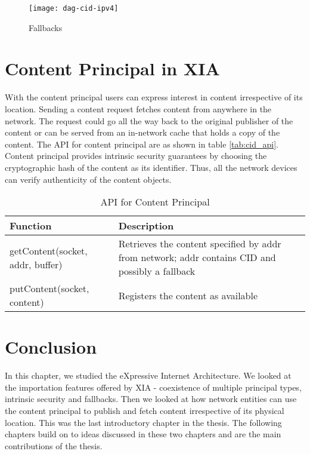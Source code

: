 \begin{figure}
  \begin{center}
    \texttt{[image: dag-cid-ipv4]}
    \caption{Fallbacks}
    \label{fig:dag_address}
  \end{center}
\end{figure}

\section{Content Principal in XIA}
With the content principal users can express interest in content
irrespective of its location. Sending a content request fetches
content from anywhere in the network. The request could go all the way
back to the original publisher of the content or can be served from an
in-network cache that holds a copy of the content. The API for content
principal are as shown in table \ref{tab:cid_api}. Content principal
provides intrinsic security guarantees by choosing the cryptographic
hash of the content as its identifier. Thus, all the network devices
can verify authenticity of the content objects.

\begin{table}
  \begin{center}
    \begin{tabular}
      { l  p{3in} }
      Function & Description \\
      \hline
      getContent(socket, addr, buffer) & Retrieves the content specified
      by addr from network; addr contains CID and possibly a fallback \\
      putContent(socket, content) & Registers the content as
      available \\
      \hline
    \end{tabular}
    \caption{API for Content Principal}
  \end{center}
  \label{tab:cid_apis}
\end{table}

\section{Conclusion}
In this chapter, we studied the eXpressive Internet Architecture. We
looked at the importation features offered by XIA - coexistence of
multiple principal types, intrinsic security and fallbacks. Then we
looked at how network entities can use the content principal to
publish and fetch content irrespective of its physical location. This
was the last introductory chapter in the thesis. The following
chapters build on to ideas discussed in these two chapters and are the
main contributions of the thesis.
